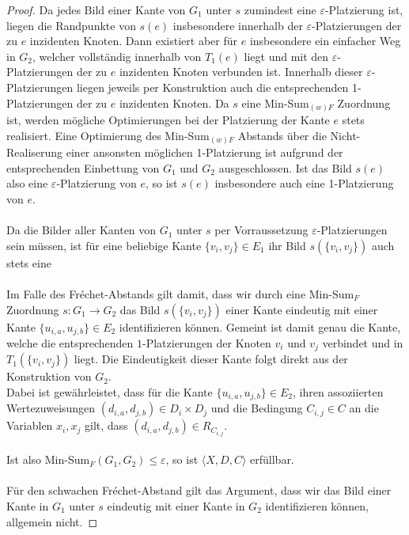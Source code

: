 \documentclass[a4paper, 12pt, twoside]{article}
\theoremstyle{Format1} %
\begin{document}
\begin{proof}
Da jedes Bild einer Kante von $G_1$ unter $s$ zumindest eine $\varepsilon$-Platzierung ist,
liegen die Randpunkte von $s(e)$ insbesondere innerhalb der $\varepsilon$-Platzierungen der zu $e$ inzidenten Knoten.
Dann existiert aber für $e$ insbesondere ein einfacher Weg in $G_2$, welcher vollständig innerhalb von $T_1(e)$ liegt und mit den
$\varepsilon$-Platzierungen der zu $e$ inzidenten Knoten verbunden ist. Innerhalb dieser $\varepsilon$-Platzierungen liegen jeweils per Konstruktion auch die
entsprechenden 1-Platzierungen der zu $e$ inzidenten Knoten. Da $s$ eine Min-Sum$_{(w)F}$ Zuordnung ist, werden mögliche Optimierungen bei der Platzierung
der Kante $e$ stets realisiert. Eine Optimierung des Min-Sum$_{(w)F}$ Abstands
über die Nicht-Realiserung einer ansonsten möglichen 1-Platzierung ist aufgrund der entsprechenden Einbettung von $G_1$ und $G_2$ ausgeschlossen.
Ist das Bild $s(e)$ also eine $\varepsilon$-Platzierung von $e$, so ist $s(e)$ insbesondere auch eine 1-Platzierung von $e$.
\\
\\
Da die Bilder aller Kanten von $G_1$ unter $s$ per Vorraussetzung $\varepsilon$-Platzierungen sein müssen, ist für eine beliebige Kante $\{v_i, v_j\} \in E_1$
ihr Bild $s(\{v_i, v_j\})$ auch stets eine 
\\
\\
Im Falle des Fréchet-Abstands gilt damit, dass wir durch eine $\text{Min-Sum}_F$ Zuordnung $s: G_1 \to G_2$ das Bild $s(\{v_i, v_j\})$ einer Kante
eindeutig mit einer Kante $\{u_{i,a}, u_{j,b}\} \in E_2$ identifizieren können. Gemeint ist damit genau die Kante, welche
die entsprechenden $1$-Platzierungen der Knoten $v_i$ und $v_j$ verbindet und in $T_1(\{v_i, v_j\})$ liegt. Die Eindeutigkeit dieser Kante folgt direkt aus der
Konstruktion von $G_2$.
\\
Dabei ist gewährleistet, dass für die Kante $\{u_{i,a}, u_{j,b}\} \in E_2$, ihren assoziierten Wertezuweisungen $(d_{i,a}, d_{j,b}) \in D_i \times D_j$
und die Bedingung $C_{i,j} \in C$ an die Variablen $x_i, x_j$ gilt, dass $(d_{i,a},d_{j,b}) \in R_{C_{i,j}}$.
\\
\\
Ist also Min-Sum$_F(G_1,G_2) \leq \varepsilon$, so ist $\langle X,D,C \rangle$ erfüllbar.
\\
\\
Für den schwachen Fréchet-Abstand gilt das Argument, dass wir das Bild einer Kante in $G_1$ unter $s$ eindeutig mit einer Kante in $G_2$ identifizieren können, allgemein nicht.


\end{proof}
\end{document}
